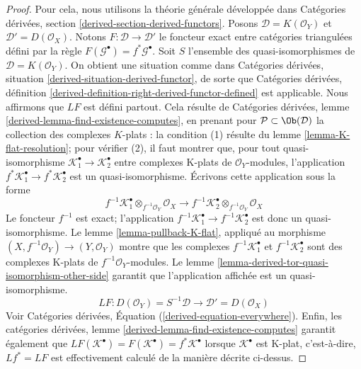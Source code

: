 \begin{proof}

Pour cela, nous utilisons la théorie générale développée dans Catégories dérivées, section \ref{derived-section-derived-functors}. Posons $\mathcal{D} = K(\mathcal{O}_Y)$ et $\mathcal{D}' = D(\mathcal{O}_X)$. Notons $F : \mathcal{D} \to \mathcal{D}'$ le foncteur exact entre catégories triangulées défini par la règle
$F(\mathcal{G}^\bullet) = f^*\mathcal{G}^\bullet$. Soit $S$ l'ensemble des quasi-isomorphismes de
$\mathcal{D} = K(\mathcal{O}_Y)$. On obtient une situation comme dans Catégories dérivées, situation \ref{derived-situation-derived-functor},
de sorte que Catégories dérivées, définition
\ref{derived-definition-right-derived-functor-defined}
est applicable. Nous affirmons que $LF$ est défini partout. Cela résulte de Catégories dérivées, lemme \ref{derived-lemma-find-existence-computes},
en prenant pour $\mathcal{P} \subset \Ob(\mathcal{D})$ la collection des complexes $K$-plats : la condition (1) résulte du lemme \ref{lemma-K-flat-resolution};
pour vérifier (2), il faut montrer que, pour tout quasi-isomorphisme
$\mathcal{K}_1^\bullet  \to \mathcal{K}_2^\bullet$ entre complexes K-plats de $\mathcal{O}_Y$-modules, l'application
$f^*\mathcal{K}_1^\bullet  \to f^*\mathcal{K}_2^\bullet$ est un quasi-isomorphisme. Écrivons cette application sous la forme
$$
f^{-1}\mathcal{K}_1^\bullet \otimes_{f^{-1}\mathcal{O}_Y} \mathcal{O}_X
\longrightarrow
f^{-1}\mathcal{K}_2^\bullet \otimes_{f^{-1}\mathcal{O}_Y} \mathcal{O}_X
$$
Le foncteur $f^{-1}$ est exact; l'application
$f^{-1}\mathcal{K}_1^\bullet  \to f^{-1}\mathcal{K}_2^\bullet$ est donc un quasi-isomorphisme. Le lemme \ref{lemma-pullback-K-flat},
appliqué au morphisme $(X, f^{-1}\mathcal{O}_Y) \to (Y, \mathcal{O}_Y)$
montre que les complexes $f^{-1}\mathcal{K}_1^\bullet$ et $f^{-1}\mathcal{K}_2^\bullet$
sont des complexes K-plats de $f^{-1}\mathcal{O}_Y$-modules. Le lemme \ref{lemma-derived-tor-quasi-isomorphism-other-side}
garantit que l'application affichée est un quasi-isomorphisme.
$$
LF :
D(\mathcal{O}_Y) = S^{-1}\mathcal{D}
\longrightarrow
\mathcal{D}' = D(\mathcal{O}_X)
$$
Voir Catégories dérivées, Équation (\ref{derived-equation-everywhere}). Enfin, les catégories dérivées, lemme \ref{derived-lemma-find-existence-computes}
garantit également que
$LF(\mathcal{K}^\bullet) = F(\mathcal{K}^\bullet) = f^*\mathcal{K}^\bullet$
lorsque $\mathcal{K}^\bullet$ est K-plat, c'est-à-dire, $Lf^* = LF$ est effectivement calculé de la manière décrite ci-dessus.

\end{proof}

